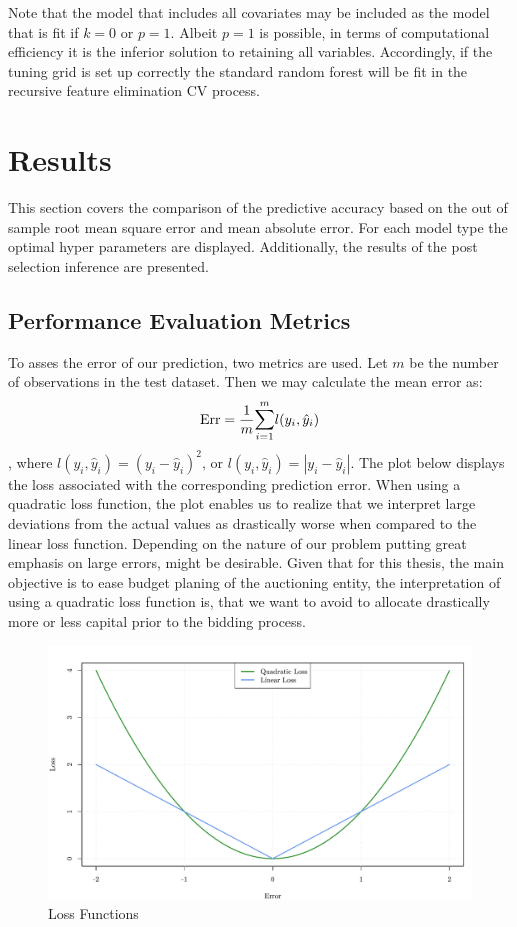 \documentclass[a4paper,12pt, headsepline]{scrartcl}
\numberwithin{equation}{section}
\begin{document}
Note that the model that includes all covariates may be included  as the model that is fit if $k = 0$ or $p = 1$. Albeit $p = 1$ is possible, in terms of computational efficiency it is the inferior solution to retaining all variables. Accordingly, if the tuning grid is set up correctly the standard random forest will be fit in the recursive feature elimination CV process. 

\section{Results}\label{sec:res}
This section covers the comparison of the predictive accuracy based on the out of sample root mean square error and mean absolute error. For each model type the optimal hyper parameters are displayed. Additionally, the results of the post selection inference are presented.

\subsection{Performance Evaluation Metrics}\label{subsec:per}
To asses the error of our prediction, two metrics are used. Let $m$ be the number of observations in the test dataset. Then we may calculate the mean error as:
\[
\text{Err} = \frac{1}{m} \mathlarger{\sum}\limits_{i = 1}^{m} l(y_i, \hat y_i)
\], where $l(y_i, \hat y_i) =( y_i - \hat y_i)^2 \text{, or } l(y_i, \hat y_i) = |y_i - \hat y_i|$. The plot below displays the loss associated with the corresponding prediction error. When using a quadratic loss function, the plot enables us to realize that we interpret large deviations from the actual values as drastically worse when compared to the linear loss function. Depending on the nature of our problem putting great emphasis on large errors, might be desirable. Given that for this thesis, the main objective is to ease budget planing of the auctioning entity, the interpretation of using a quadratic loss function is, that we want to avoid to allocate drastically more or less capital prior to the bidding process.
\begin{figure}[H]
	\includegraphics[width = 14	cm]{figures/Lossfun.pdf}
	\caption{Loss Functions}\label{fig:lossfun}
\end{figure}
\end{document}
